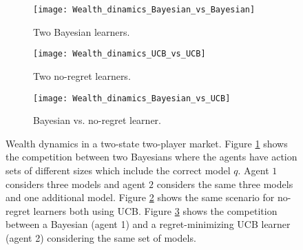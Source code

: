 \begin{figure}[t!]
    \centering
    \vspace{-5pt}
    \begin{subfigure}[b]{0.325\textwidth}
        \centering
        \texttt{[image: Wealth\_dinamics\_Bayesian\_vs\_Bayesian]}
        \vspace{-8pt}
        \caption{Two Bayesian learners.}
        \label{fig:wealth-dynamics-two-Bayesians}
    \end{subfigure}
    \hfill
    \begin{subfigure}[b]{0.325\textwidth}
        \centering
        \texttt{[image: Wealth\_dinamics\_UCB\_vs\_UCB]}
        \vspace{-8pt}
        \caption{Two no-regret learners.}
        \label{fig:wealth-dynamics-two-UCB-agents}
    \end{subfigure}
    \hfill
    \begin{subfigure}[b]{0.325\textwidth}
        \centering
        \texttt{[image: Wealth\_dinamics\_Bayesian\_vs\_UCB]}
        \vspace{-8pt}
        \caption{Bayesian vs. no-regret learner.}
        \label{fig:wealth-dynamics-Bayesian-vs-UCB}
    \end{subfigure}
    \caption{Wealth dynamics in a two-state two-player market. Figure \ref{fig:wealth-dynamics-two-Bayesians} shows the competition between two Bayesians where the agents have action sets of different sizes which include the correct model $q$. Agent $1$ considers three models and agent $2$ considers the same three models and one additional model. Figure \ref{fig:wealth-dynamics-two-UCB-agents} shows the same scenario for no-regret learners both using UCB. Figure \ref{fig:wealth-dynamics-Bayesian-vs-UCB} shows the competition between a Bayesian (agent 1) and a regret-minimizing UCB learner (agent 2) considering the same set of models.}
    \vspace{-5pt}
    \label{fig:wealth-figures-2}
\end{figure}
